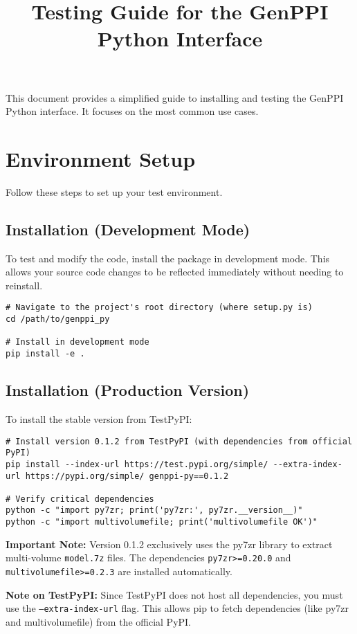 \documentclass[11pt, a4paper]{article}
\title{\bfseries Testing Guide for the GenPPI Python Interface}
\author{}
\date{}
\begin{document}
\maketitle

This document provides a simplified guide to installing and testing the GenPPI Python interface. It focuses on the most common use cases.

\section{Environment Setup}
Follow these steps to set up your test environment.

\subsection{Installation (Development Mode)}
To test and modify the code, install the package in development mode. This allows your source code changes to be reflected immediately without needing to reinstall.

\begin{lstlisting}[style=bashstyle]
# Navigate to the project's root directory (where setup.py is)
cd /path/to/genppi_py

# Install in development mode
pip install -e .
\end{lstlisting}

\subsection{Installation (Production Version)}
To install the stable version from TestPyPI:

\begin{lstlisting}[style=bashstyle]
# Install version 0.1.2 from TestPyPI (with dependencies from official PyPI)
pip install --index-url https://test.pypi.org/simple/ --extra-index-url https://pypi.org/simple/ genppi-py==0.1.2

# Verify critical dependencies
python -c "import py7zr; print('py7zr:', py7zr.__version__)"
python -c "import multivolumefile; print('multivolumefile OK')"
\end{lstlisting}

\textbf{Important Note:} Version 0.1.2 exclusively uses the py7zr library to extract multi-volume \texttt{model.7z} files. The dependencies \texttt{py7zr>=0.20.0} and \texttt{multivolumefile>=0.2.3} are installed automatically.

\textbf{Note on TestPyPI:} Since TestPyPI does not host all dependencies, you must use the \texttt{--extra-index-url} flag. This allows pip to fetch dependencies (like py7zr and multivolumefile) from the official PyPI.
\end{document}
